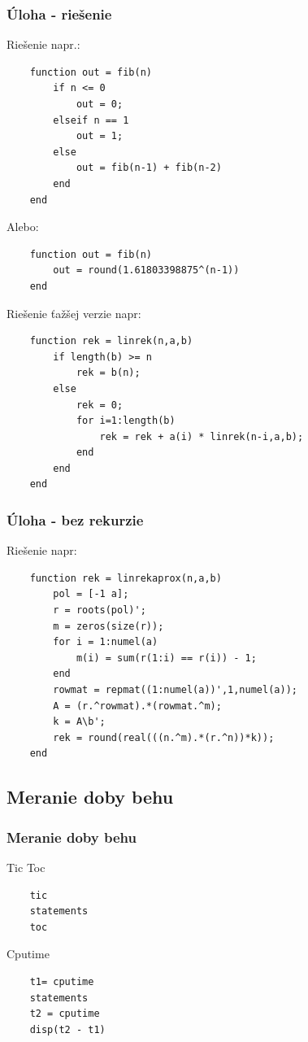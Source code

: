 \documentclass{beamer}
\begin{document}
\begin{frame}[fragile]
\frametitle{Úloha - riešenie}
    \begin{block}{Riešenie napr.:}
  \begin{verbatim}
    function out = fib(n)
        if n <= 0
            out = 0;
        elseif n == 1
            out = 1;
        else
            out = fib(n-1) + fib(n-2)
        end
    end \end{verbatim}
  \end{block}
  \pause  
  \begin{block}{Alebo:}
  \begin{verbatim}
    function out = fib(n)
        out = round(1.61803398875^(n-1))
    end \end{verbatim}
  \end{block}
\end{frame}  

\begin{frame}[fragile]
    \begin{block}{Riešenie ťažšej verzie napr:}
  \begin{verbatim}
    function rek = linrek(n,a,b)
        if length(b) >= n
            rek = b(n);
        else
            rek = 0;
            for i=1:length(b)
                rek = rek + a(i) * linrek(n-i,a,b);
            end
        end
    end \end{verbatim}
  \end{block}
\end{frame}

\begin{frame}[fragile]
\frametitle{Úloha - bez rekurzie}
  \begin{block}{Riešenie napr:}
  \begin{verbatim}
    function rek = linrekaprox(n,a,b)
        pol = [-1 a];
        r = roots(pol)';
        m = zeros(size(r));
        for i = 1:numel(a)
            m(i) = sum(r(1:i) == r(i)) - 1;
        end
        rowmat = repmat((1:numel(a))',1,numel(a));
        A = (r.^rowmat).*(rowmat.^m);
        k = A\b';
        rek = round(real(((n.^m).*(r.^n))*k));
    end \end{verbatim}
  \end{block}
\end{frame}

\subsection{Meranie doby behu}

\begin{frame}[fragile]
\frametitle{Meranie doby behu}
  \begin{block}{Tic Toc}
  \begin{verbatim}
    tic
    statements
    toc \end{verbatim}
  \end{block}
  
  \begin{block}{Cputime}
  \begin{verbatim}
    t1= cputime
    statements
    t2 = cputime
    disp(t2 - t1) \end{verbatim}
  \end{block}
\end{frame}
\end{document}
